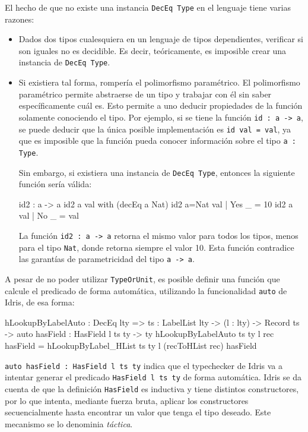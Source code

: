 El hecho de que no existe una instancia \texttt{DecEq Type} en el lenguaje tiene varias razones:

\begin{itemize}
\item Dados dos tipos cualesquiera en un lenguaje de tipos dependientes, verificar si son iguales no es decidible. Es decir, teóricamente, es imposible crear una instancia de \texttt{DecEq Type}.
\item Si existiera tal forma, rompería el polimorfismo paramétrico. El polimorfismo paramétrico permite abstraerse de un tipo y trabajar con él sin saber específicamente cuál es. Esto permite a uno deducir propiedades de la función solamente conociendo el tipo. Por ejemplo, si se tiene la función \texttt{id : a -> a}, se puede deducir que la única posible implementación es \texttt{id val = val}, ya que es imposible que la función pueda conocer información sobre el tipo \texttt{a : Type}.

Sin embargo, si existiera una instancia de \texttt{DecEq Type}, entonces la siguiente función sería válida:

\begin{code}
id2 : a -> a
id2 {a} val with (decEq a Nat)
  id2 {a=Nat} val | Yes _ = 10
  id2 {a} val | No _ = val
\end{code}

La función \texttt{id2 : a -> a} retorna el mismo valor para todos los tipos, menos para el tipo \texttt{Nat}, donde retorna siempre el valor 10. Esta función contradice las garantías de parametricidad del tipo \texttt{a -> a}.
\end{itemize}

A pesar de no poder utilizar \texttt{TypeOrUnit}, es posible definir una función que calcule el predicado de forma automática, utilizando la funcionalidad \texttt{auto} de Idris, de esa forma:

\begin{code}
hLookupByLabelAuto : DecEq lty => {ts : LabelList lty} ->
  (l : lty) -> Record ts ->
  {auto hasField : HasField l ts ty} -> ty
hLookupByLabelAuto {ts} {ty} l rec {hasField} =
  hLookupByLabel_HList {ts} {ty} l (recToHList rec) hasField
\end{code}

\texttt{auto hasField : HasField l ts ty} indica que el typechecker de Idris va a intentar generar el predicado \texttt{HasField l ts ty} de forma automática. Idris se da cuenta de que la definición \texttt{HasField} es inductiva y tiene distintos constructores, por lo que intenta, mediante fuerza bruta, aplicar los constructores secuencialmente hasta encontrar un valor que tenga el tipo deseado. Este mecanismo se lo denominia \textit{táctica}.

